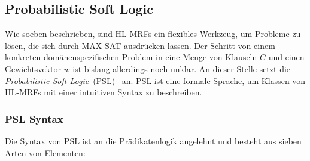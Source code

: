 \subsection{Probabilistic Soft Logic}%
\label{sec:theory:psl:psl}

Wie soeben beschrieben, sind HL-MRFs ein flexibles Werkzeug, um Probleme zu lösen, die sich durch MAX-SAT ausdrücken lassen.
Der Schritt von einem konkreten domänenspezifischen Problem in eine Menge von Klauseln $C$ und einen Gewichtsvektor $w$ ist bislang allerdings noch unklar.
An dieser Stelle setzt die \textit{Probabilistic Soft Logic}~(PSL)~\cite{Broecheler2010}\cite{Bach2015} an.
PSL ist eine formale Sprache, um Klassen von HL-MRFs mit einer intuitiven Syntax zu beschreiben.

\subsubsection{PSL Syntax}
Die Syntax von PSL ist an die Prädikatenlogik angelehnt und besteht aus sieben Arten von Elementen:
